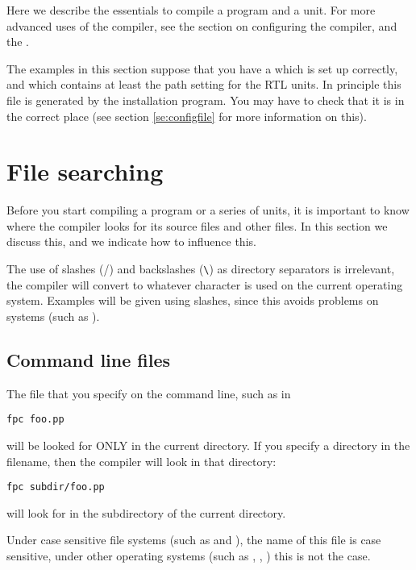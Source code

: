 Here we describe the essentials to compile a program and a unit.
For more advanced uses of the compiler, see the section on configuring 
the compiler, and the \progref{}.

The examples in this section suppose that you have a  which
is set up correctly, and which contains at least the path setting for the
RTL units. In principle this file is generated by the installation program.
You may have to check that it is in the correct place (see section
\ref{se:configfile} for more information on this).

\section{File searching}
Before you start compiling a program or a series of units, it is
important to know where the compiler looks for its source files and other
files. In this section we discuss this, and we indicate how to influence
this.

\begin{remark}
The use of slashes (/) and backslashes (\verb+\+) as directory separators
is irrelevant, the compiler will convert to whatever character is used on
the current operating system. Examples will be given using slashes, since
this avoids problems on \unix systems (such as \linux).
\end{remark}

\subsection{Command line files}
The file that you specify on the command line, such as in
\begin{verbatim}
fpc foo.pp
\end{verbatim}
will be looked for ONLY in the current directory. If you specify a directory
in the filename, then the compiler will look in that directory:
\begin{verbatim}
fpc subdir/foo.pp
\end{verbatim}
will look for  in the subdirectory  of the current
directory.

Under case sensitive file systems (such as \linux and \unix), the name of this 
file is case sensitive, under other operating systems (such as \dos, \windowsnt, \ostwo) 
this is not the case.

